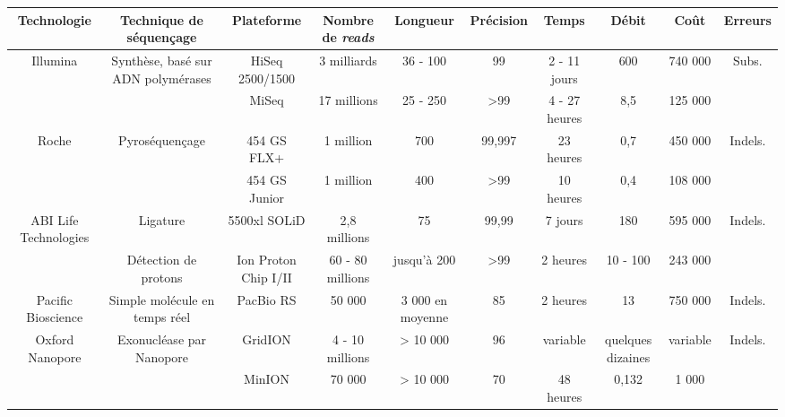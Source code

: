 		\begin{longtable}{|c|c|c|c|c|c|c|c|c|c|}
			\hline
			Technologie & Technique de séquençage & Plateforme & Nombre de \emph{reads} & Longueur & Précision &
			Temps & Débit & Coût & Erreurs \\
			\hline
			\multirow{2}{*}{Illumina} & \multirow{2}{*}{Synthèse, basé sur ADN polymérases} & HiSeq 2500/1500 & 
			3 milliards & 36 - 100 & 99 & 2 - 11 jours & 600 & 740 000 & \multirow{2}{*}{Subs.} \\
			& & MiSeq & 17 millions &	25 - 250 & >99 & 4 - 27 heures & 8,5 & 125 000 & \\
			\hline
			\multirow{2}{*}{Roche} & \multirow{2}{*}{Pyroséquençage} & 454 GS FLX+ & 1 million & 700 & 
			99,997 & 23 heures & 0,7 & 450 000 & \multirow{2}{*}{Indels.} \\
			& & 454 GS Junior & 1 million & 400 & >99 & 10 heures & 0,4 & 108 000 & \\
			\hline
			\multirow{2}{*}{ABI Life Technologies} & Ligature & 5500xl SOLiD & 2,8 millions & 75 & 99,99 & 
			7 jours & 180 & 595 000 & \multirow{2}{*}{Indels.} \\
			& Détection de protons & Ion Proton Chip I/II & 60 - 80 millions & jusqu'à 200 & >99 & 
			2 heures & 10 - 100 & 243 000 & \\
			\hline
			Pacific Bioscience & Simple molécule en temps réel & PacBio RS & 50 000 & 3 000 en moyenne &
			85 & 2 heures & 13 & 750 000 & Indels. \\
			\hline
			\multirow{2}{*}{Oxford Nanopore} & \multirow{2}{*}{Exonucléase par Nanopore} & GridION & 
			4 - 10 millions & > 10 000 & 96 & variable & quelques dizaines & variable & \multirow{2}{*}{Indels.} \\
			& & MinION & 70 000 & > 10 000 & 70 & 48 heures & 0,132 & 1 000 & \\
			\hline
		\end{longtable}
